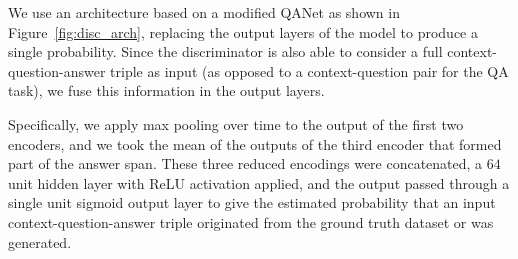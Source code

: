 \documentclass[11pt,a4paper]{article}
\begin{document}
We use an architecture based on a modified QANet as shown in Figure~\ref{fig:disc_arch}, replacing the output layers of the model to produce a single probability. Since the discriminator is also able to consider a full context-question-answer triple as input (as opposed to a context-question pair for the QA task), we fuse this information in the output layers.

Specifically, we apply max pooling over time to the output of the first two encoders, and we took the mean of the outputs of the third encoder that formed part of the answer span. These three reduced encodings were concatenated, a $64$ unit hidden layer with ReLU activation applied, and the output passed through a single unit sigmoid output layer to give the estimated probability that an input context-question-answer triple originated from the ground truth dataset or was generated.
\end{document}
